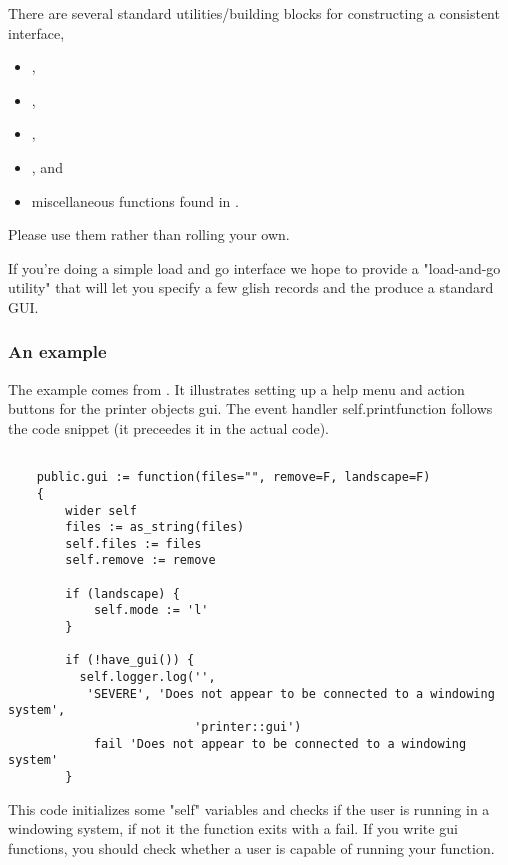 There are several standard utilities/building blocks for constructing a 
consistent interface,  
\begin{itemize}
\item {},
\item {},
\item {},
\item {}, and
\item miscellaneous functions found in .
\end{itemize}
Please use them rather than rolling your own.

If you're
doing a simple load and go interface we hope to provide a "load-and-go utility"
that will let you specify a few glish records and the produce a standard GUI.
\subsubsection{An example}

The example comes from . 
It illustrates setting up a help menu and action buttons for
the printer objects gui.  The event handler self.printfunction follows the
code snippet (it preceedes it in the actual code).

\begin{verbatim}

    public.gui := function(files="", remove=F, landscape=F)
    {
        wider self
        files := as_string(files)
        self.files := files
        self.remove := remove
 
        if (landscape) {
            self.mode := 'l'
        }
 
        if (!have_gui()) {
          self.logger.log('', 
           'SEVERE', 'Does not appear to be connected to a windowing system',
                          'printer::gui')
            fail 'Does not appear to be connected to a windowing system'
        }
\end{verbatim}

This code initializes some "self" variables and checks if the
user is running in a windowing system, if not it the function exits with a
fail.  If you write gui functions, you should check whether a user is capable
of running your function.


